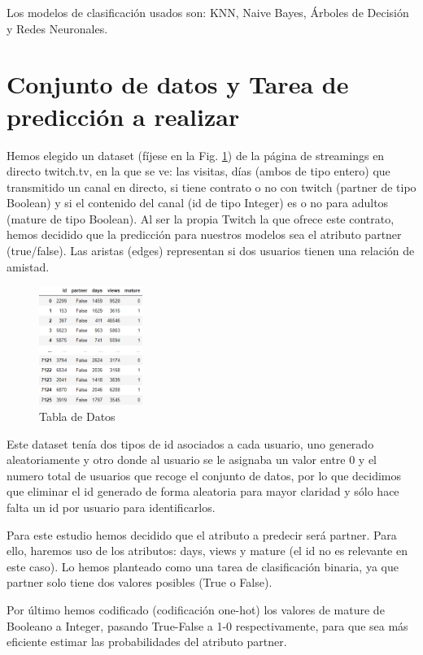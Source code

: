 \documentclass[conference,a4paper]{IEEEtran}
\begin{document}
Los modelos de clasificación usados son: KNN, Naive Bayes, Árboles de Decisión y Redes Neuronales.

\section{Conjunto de datos y Tarea de predicción a realizar}
Hemos elegido un dataset (fíjese en la Fig. \ref{fig:dataset}) de la página de streamings en directo twitch.tv, en la que se ve: las visitas, días (ambos de tipo entero) que transmitido un canal en directo, si tiene contrato o no con twitch (partner de tipo Boolean) y si el contenido del canal (id de tipo Integer) es o no para adultos (mature de tipo Boolean). Al ser la propia Twitch la que ofrece este contrato, hemos decidido que la predicción para nuestros modelos sea el atributo partner (true/false). Las aristas (edges) representan si dos usuarios tienen una relación de amistad.

\begin{figure} %
    \centering
    \includegraphics[width=0.3\textwidth]{./ImagenesMemoria/dataset}
    \caption{\label{fig:dataset}Tabla de Datos}
\end{figure}

Este dataset tenía dos tipos de id asociados a cada usuario, uno generado aleatoriamente y otro donde al usuario se le asignaba un valor entre 0 y el numero total de usuarios que recoge el conjunto de datos, por lo que decidimos que eliminar el id generado de forma aleatoria para mayor claridad y sólo hace falta un id por usuario para identificarlos.


Para este estudio hemos decidido que el atributo a predecir será partner. Para ello, haremos uso de los atributos: days, views y mature (el id no es relevante en este caso). Lo hemos planteado como una tarea de clasificación binaria, ya que partner solo tiene dos valores posibles (True o False).

 Por último hemos codificado (codificación one-hot) los valores de mature de Booleano a Integer, pasando True-False a 1-0 respectivamente, para que sea más eficiente estimar las probabilidades del atributo partner.
\end{document}
